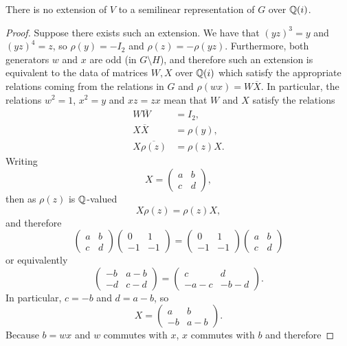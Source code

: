 \begin{lemma}\label{lem:noextension}
    There is no extension of $V$ to a semilinear representation of $G$ over ${\mathbb Q}(i)$.
\end{lemma}
\begin{proof}
Suppose there exists such an extension. We have that $(yz)^3 = y$ and $(yz)^4 = z$, so $\rho(y) = -I_2$ and $\rho(z) = -\rho(yz)$. Furthermore, both generators $w$ and $x$ are odd (in $G \setminus H$), and therefore such an extension is equivalent to the data of matrices $W,X$ over ${\mathbb Q}(i)$ which satisfy the appropriate relations coming from the relations in $G$ and $\rho(wx) = W \overline{X}$. In particular, the relations $w^2 = 1$, $x^2 = y$ and $xz = zx$ mean that $W$ and $X$ satisfy the relations
\begin{align*}
W \overline{W} &= I_2, \\ 
X \overline{X} &= \rho(y), \\
X \overline{\rho(z)} &= \rho(z) X.
\end{align*}
Writing
\[
X = \begin{pmatrix} a & b \\ c & d \end{pmatrix},
\]
then as $\rho(z)$ is ${\mathbb Q}$-valued
\[
X \rho(z) = \rho(z) X,
\]
and therefore
\[
\begin{pmatrix} a & b \\ c & d \end{pmatrix} \begin{pmatrix} 0 & 1 \\ -1 & -1 \end{pmatrix} 
=
\begin{pmatrix} 0 & 1 \\ -1 & -1 \end{pmatrix}\begin{pmatrix} a & b \\ c & d \end{pmatrix}
\]
or equivalently
\[
\begin{pmatrix} -b & a-b \\ -d & c-d \end{pmatrix} = \begin{pmatrix} c & d \\ -a-c & -b-d \end{pmatrix}.
\]
In particular, $c = -b$ and $d = a-b$, so
\[
X = \begin{pmatrix} a & b \\ -b & a-b \end{pmatrix}.
\]
Because $b = wx$ and $w$ commutes with $x$, $x$ commutes with $b$ and therefore

\end{proof}
